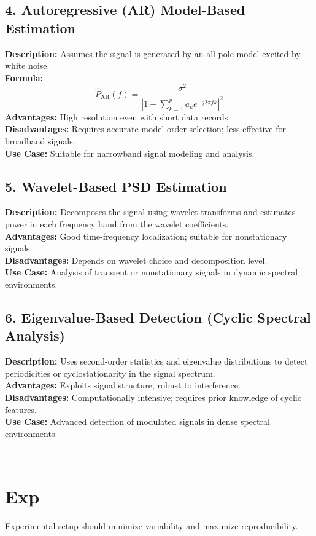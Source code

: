 \documentclass[10pt]{report}
\begin{document}
\subsection*{4. Autoregressive (AR) Model-Based Estimation}
\textbf{Description:} Assumes the signal is generated by an all-pole model excited by white noise.\\
\textbf{Formula:}
\[
\hat{P}_{\text{AR}}(f) = \frac{\sigma^2}{\left|1 + \sum_{k=1}^p a_k e^{-j 2 \pi f k} \right|^2}
\]
\textbf{Advantages:} High resolution even with short data records.\\
\textbf{Disadvantages:} Requires accurate model order selection; less effective for broadband signals.\\
\textbf{Use Case:} Suitable for narrowband signal modeling and analysis.

\subsection*{5. Wavelet-Based PSD Estimation}
\textbf{Description:} Decomposes the signal using wavelet transforms and estimates power in each frequency band from the wavelet coefficients.\\
\textbf{Advantages:} Good time-frequency localization; suitable for nonstationary signals.\\
\textbf{Disadvantages:} Depends on wavelet choice and decomposition level.\\
\textbf{Use Case:} Analysis of transient or nonstationary signals in dynamic spectral environments.

\subsection*{6. Eigenvalue-Based Detection (Cyclic Spectral Analysis)}
\textbf{Description:} Uses second-order statistics and eigenvalue distributions to detect periodicities or cyclostationarity in the signal spectrum.\\
\textbf{Advantages:} Exploits signal structure; robust to interference.\\
\textbf{Disadvantages:} Computationally intensive; requires prior knowledge of cyclic features.\\
\textbf{Use Case:} Advanced detection of modulated signals in dense spectral environments.

---

\section*{Exp}
Experimental setup should minimize variability and maximize reproducibility.
\end{document}
